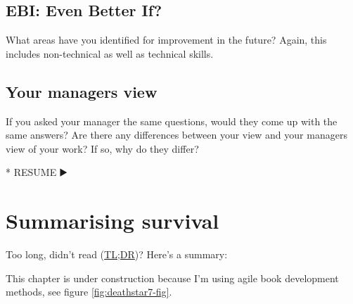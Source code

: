 \documentclass[
]{book}
\newenvironment{Shaded}{\begin{snugshade}}{\end{snugshade}}
\newcommand{\NormalTok}[1]{#1}
\newcommand{\SpecialStringTok}[1]{\textcolor[rgb]{0.31,0.60,0.02}{#1}}
\begin{document}
\hypertarget{ebi-even-better-if}{%
\subsection{EBI: Even Better If?}\label{ebi-even-better-if}}

What areas have you identified for improvement in the future? Again, this includes non-technical as well as technical skills.

\hypertarget{your-managers-view}{%
\subsection{Your managers view}\label{your-managers-view}}

If you asked your manager the same questions, would they come up with the same answers? Are there any differences between your view and your managers view of your work? If so, why do they differ?

\begin{Shaded}
\begin{Highlighting}[]
\SpecialStringTok{* }\NormalTok{RESUME ▶️}
\end{Highlighting}
\end{Shaded}

\hypertarget{tldr10}{%
\section{Summarising survival}\label{tldr10}}

Too long, didn't read (\href{https://en.wiktionary.org/wiki/too_long;_didn\%27t_read}{TL;DR})? Here's a summary:

This chapter is under construction because I'm using agile book development methods, see figure \ref{fig:deathstar7-fig}.
\end{document}

